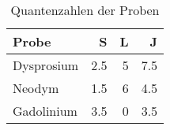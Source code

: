 \begin{table}[!h]
\begin{center}
\begin{tabular}{|l|r|r|r|}
\hline
Probe & S & L & J \\
\hline
\hline

Dysprosium & 2.5 & 5 & 7.5\\
Neodym     & 1.5 & 6 & 4.5\\
Gadolinium & 3.5 & 0 & 3.5\\

\hline
\end{tabular}
\caption{Quantenzahlen der Proben}
\label{quanten}
\end{center}
\end{table}